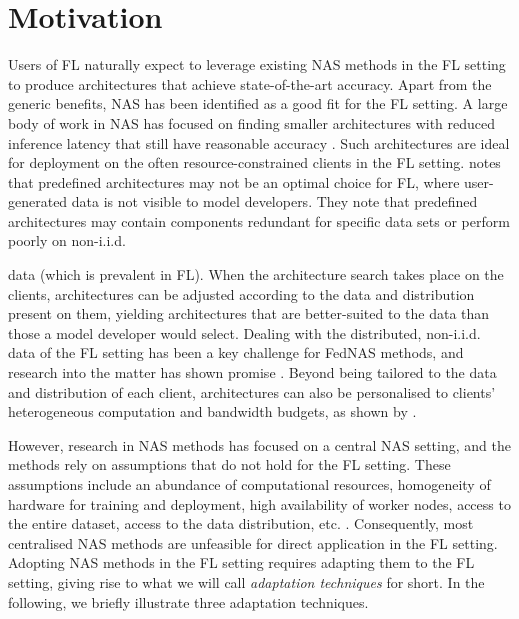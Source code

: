 \section{Motivation}

 




Users of FL naturally expect to leverage existing NAS methods in the FL setting to produce architectures that achieve state-of-the-art accuracy. Apart from the generic benefits, NAS has been identified as a good fit for the FL setting. A large body of work in NAS has focused on finding smaller architectures with reduced inference latency that still have reasonable accuracy \cite{nas_1000_papers_2023}. Such architectures are ideal for deployment on the often resource-constrained clients in the FL setting. \cite{fl_advances_and_open_problems_2021} notes that predefined architectures may not be an optimal choice for FL, where user-generated data is not visible to model developers. They note that predefined architectures may contain components redundant for specific data sets or perform poorly on non-i.i.d.

data (which is prevalent in FL). When the architecture search takes place on the clients, architectures can be adjusted according to the data and distribution present on them, yielding architectures that are better-suited to the data than those a model developer would select. Dealing with the distributed, non-i.i.d. data of the FL setting has been a key challenge for FedNAS methods, and research into the matter has shown promise \cite{fednas_2021} \cite{rl_fednas_2021} \cite{fedoras_2022} \cite{finch_2024} \cite{peaches_2024}. Beyond being tailored to the data and distribution of each client, architectures can also be personalised to clients' heterogeneous computation and bandwidth budgets, as shown by \cite{superfednas_2024} \cite{fedoras_2022} \cite{perfedrlnas_2024} \cite{decnas_2022}. 

% 

However, research in NAS methods has focused on a central NAS setting, and the methods rely on assumptions that do not hold for the FL setting. These assumptions include an abundance of computational resources, homogeneity of hardware for training and deployment, high availability of worker nodes, access to the entire dataset, access to the data distribution, etc. \cite{fl_advances_and_open_problems_2021}. Consequently, most centralised NAS methods are unfeasible for direct application in the FL setting. Adopting NAS methods in the FL setting requires adapting them to the FL setting, giving rise to what we will call \textit{adaptation techniques} for short. In the following, we briefly illustrate three adaptation techniques. 

